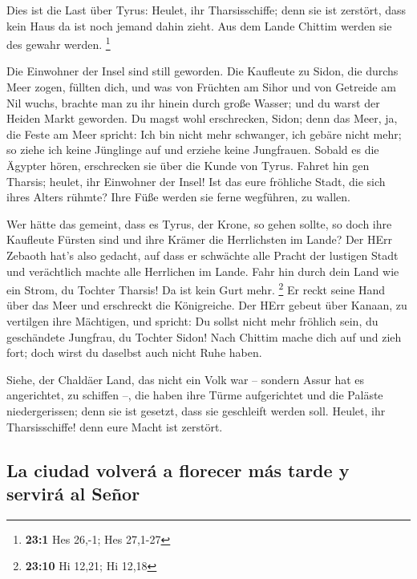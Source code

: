  Dies ist die Last über Tyrus: Heulet, ihr Tharsisschiffe;
denn sie ist zerstört, dass kein Haus da ist noch jemand dahin zieht.
Aus dem Lande Chittim werden sie des gewahr werden. \footnote{\textbf{23:1}
  Hes 26,-1; Hes 27,1-27}

 Die Einwohner der Insel sind still geworden. Die
Kaufleute zu Sidon, die durchs Meer zogen, füllten dich, 
und was von Früchten am Sihor und von Getreide am Nil wuchs, brachte man
zu ihr hinein durch große Wasser; und du warst der Heiden Markt
geworden.  Du magst wohl erschrecken, Sidon; denn das
Meer, ja, die Feste am Meer spricht: Ich bin nicht mehr schwanger, ich
gebäre nicht mehr; so ziehe ich keine Jünglinge auf und erziehe keine
Jungfrauen.  Sobald es die Ägypter hören, erschrecken sie
über die Kunde von Tyrus.  Fahret hin gen Tharsis; heulet,
ihr Einwohner der Insel!  Ist das eure fröhliche Stadt,
die sich ihres Alters rühmte? Ihre Füße werden sie ferne wegführen, zu
wallen.

 Wer hätte das gemeint, dass es Tyrus, der Krone, so gehen
sollte, so doch ihre Kaufleute Fürsten sind und ihre Krämer die
Herrlichsten im Lande?  Der HErr Zebaoth hat's also
gedacht, auf dass er schwächte alle Pracht der lustigen Stadt und
verächtlich machte alle Herrlichen im Lande.  Fahr hin
durch dein Land wie ein Strom, du Tochter Tharsis! Da ist kein Gurt
mehr. \footnote{\textbf{23:10} Hi 12,21; Hi 12,18}  Er
reckt seine Hand über das Meer und erschreckt die Königreiche. Der HErr
gebeut über Kanaan, zu vertilgen ihre Mächtigen,  und
spricht: Du sollst nicht mehr fröhlich sein, du geschändete Jungfrau, du
Tochter Sidon! Nach Chittim mache dich auf und zieh fort; doch wirst du
daselbst auch nicht Ruhe haben.

 Siehe, der Chaldäer Land, das nicht ein Volk war --
sondern Assur hat es angerichtet, zu schiffen --, die haben ihre Türme
aufgerichtet und die Paläste niedergerissen; denn sie ist gesetzt, dass
sie geschleift werden soll.  Heulet, ihr Tharsisschiffe!
denn eure Macht ist zerstört.

\hypertarget{la-ciudad-volveruxe1-a-florecer-muxe1s-tarde-y-serviruxe1-al-seuxf1or}{%
\subsection{La ciudad volverá a florecer más tarde y servirá al
Señor}\label{la-ciudad-volveruxe1-a-florecer-muxe1s-tarde-y-serviruxe1-al-seuxf1or}}

